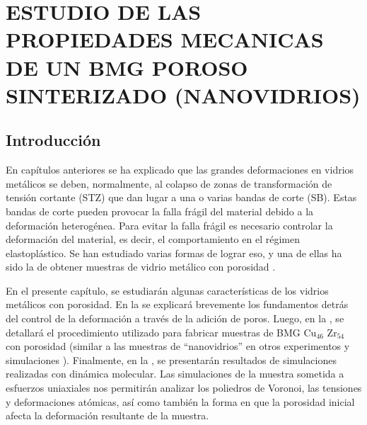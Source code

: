 
\chapter{ESTUDIO DE LAS PROPIEDADES MECANICAS DE UN BMG POROSO SINTERIZADO (NANOVIDRIOS)} %

\label{C5} %




\section{Introducción}
\label{S5_1}

En capítulos anteriores se ha explicado que las grandes deformaciones en vidrios metálicos se deben, normalmente,
al colapso de zonas de transformación de tensión cortante (STZ) que dan lugar a una o varias bandas de corte (SB).
Estas bandas de corte pueden provocar la falla frágil del material debido a la deformación heterogénea.
Para evitar la falla frágil es necesario controlar la deformación del material, es decir, el comportamiento en el régimen elastoplástico.
Se han estudiado varias formas de lograr eso, y una de ellas ha sido la de obtener muestras de vidrio metálico con porosidad 
\citep{guan13,wang10,schuh07,liontas14}.

En el presente capítulo, se estudiarán algunas características de los vidrios metálicos con porosidad. En la  se explicará
brevemente los fundamentos detrás del control de la deformación a través de la adición de poros.
Luego, en la , se detallará el procedimiento utilizado para fabricar muestras de BMG Cu$_{46}$ Zr$_{54}$ con porosidad
(similar a las muestras de ``nanovidrios'' en otros experimentos y simulaciones \citep{adibi13,albe13}). Finalmente, en la ,
se presentarán resultados de simulaciones
realizadas con dinámica molecular. Las simulaciones de la muestra sometida a esfuerzos uniaxiales nos permitirán analizar los poliedros
de Voronoi, las tensiones y deformaciones atómicas, así como también la forma en que la porosidad inicial afecta la deformación resultante
de la muestra.

